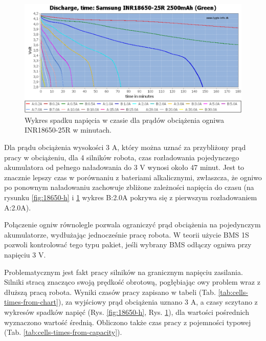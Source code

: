 \documentclass{report}
\begin{document}
\begin{enumerate}[label=(\Alph*)]
    \begin{figure}[H]
        \centering
        \includegraphics{src/cells_charts/Li-ion discharge minutes.png}
        \caption{Wykres spadku napięcia w czasie dla prądów obciążenia ogniwa INR18650-25R w minutach. \cite{18650Charts}}
        \label{fig:18650-m}
    \end{figure}

    Dla prądu obciążenia wysokości 3 A, który można uznać za przybliżony prąd pracy w obciążeniu, dla 4 silników robota, czas rozładowania pojedynczego akumulatora od pełnego naładowania do 3 V wynosi około 47 minut. Jest to znacznie lepszy czas w porównaniu z bateriami alkalicznymi, zwłaszcza, że ogniwo po ponownym naładowaniu zachowuje zbliżone zależności napięcia do czasu (na rysunku \ref{fig:18650-h} i \ref{fig:18650-m} wykres B:2.0A pokrywa się z pierwszym rozładowaniem A:2.0A).
    
    Połączenie ogniw równolegle pozwala ograniczyć prąd obciążenia na pojedynczym akumulatorze, wydłużając jednocześnie pracę robota. W teorii użycie BMS 1S pozwoli kontrolować tego typu pakiet, jeśli wybrany BMS odłączy ogniwa przy napięciu 3 V. 
    
    Problematycznym jest fakt pracy silników na granicznym napięciu zasilania. Silniki stracą znacząco swoją prędkość obrotową, pogłębiając owy problem wraz z dłuższą pracą robota. Wyniki czasów pracy zapisano w tabeli (Tab. \ref{tab:cells-times-from-chart}), za wyjściowy prąd obciążenia uznano 3 A, a czasy sczytano z wykresów spadków napięć (Rys. \ref{fig:18650-h}, Rys. \ref{fig:18650-m}), dla wartości pośrednich wyznaczono wartość średnią. Obliczono także czas pracy z pojemności typowej (Tab. \ref{tab:cells-times-from-capacity}).


\end{enumerate}
\end{document}
